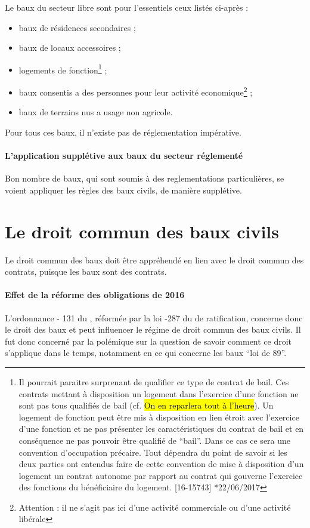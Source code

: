 \documentclass[10pt,a4paper,twoside]{article}
\makeatletter
\newcommand*{\civTrois}{\@ifstar{civ. 3\ieme{}\xspace}{troisième chambre
	civile\xspace}}
\newcommand*{\CourDeCas}{\@ifstar{Cass.\xspace}{Cour de Cassation\xspace}}
\newcommand*{\jurisCourDeCas}{\@ifstar{\jurisCourDeCasStared%
	}{\jurisCourDeCasNotStared}}
\newcommand*{\jurisCourDeCasStared}[3][]{\CourDeCas* #2*,
	\printdate{#3}\ifthenelse{\equal{#1}{}}{}{, \no#1}} %
\newcommand*{\jurisCourDeCasNotStared}[3][]{\CourDeCas #2,
	\printdate{#3}\ifthenelse{\equal{#1}{}}{}{, \no#1}} %
\makeatother
\begin{document}
		Le baux du secteur libre sont pour l'essentiels ceux listés ci-après :
		\begin{itemize}
			\item baux de résidences secondaires ;
			\item baux de locaux accessoires ;
			\item logements de fonction\footnote{Il pourrait paraitre surprenant de
				qualifier ce type de contrat de bail. Ces contrats mettant à
				disposition un logement dans l'exercice d'une fonction ne sont pas
				tous qualifiés de bail (cf. \hl{On en reparlera tout à l'heure}). Un
				logement de fonction peut être mis à disposition en lien étroit avec
				l'exercice d'une fonction et ne pas présenter les caractéristiques du
				contrat de bail et en conséquence ne pas pouvoir être qualifié de
				\enquote{bail}. Dans ce cas ce sera une convention d'occupation
				précaire. Tout dépendra du point de savoir si les deux parties ont
				entendus faire de cette convention de mise à disposition d'un logement
				un contrat autonome par rapport au contrat qui gouverne l'exercice des
				fonctions du bénéficiaire du logement. \jurisCourDeCas[16-15743]{
				\civTrois*}{22/06/2017}} ;
			\item baux consentis a des personnes pour leur activité
				economique\footnote{Attention : il ne s'agit pas ici d'une activité
				commerciale ou d'une activité libérale} ;
			\item baux de terrains nus a usage non agricole.
		\end{itemize}

		Pour tous ces baux, il n'existe pas de réglementation impérative.

	\paragraph{L'application supplétive aux baux du secteur réglementé} Bon nombre
		de baux, qui sont soumis à des reglementations particulières, se voient
		appliquer les règles des baux civils, de manière supplétive.

\section{Le droit commun des baux civils}

	Le droit commun des baux doit être appréhendé en lien avec le droit commun
		des contrats, puisque les baux sont des contrats.

	\paragraph{Effet de la réforme des obligations de 2016} L'ordonnance -
		131 du , réformée par la loi -287 du
		 de ratification, concerne donc le droit des baux et
		peut influencer le régime de droit commun des baux civils.
	Il fut donc concerné par la polémique sur la question de savoir comment ce
		droit s'applique dans le temps, notamment en ce qui concerne les baux
		\enquote{loi de 89}.
\end{document}
